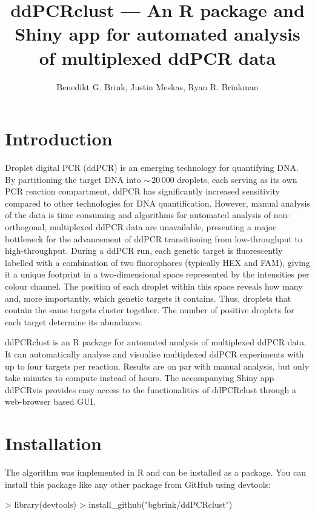 \documentclass{article}
\title{ddPCRclust --- An R package and Shiny app for automated analysis of multiplexed ddPCR data}
\author{Benedikt G. Brink, Justin Meskas, Ryan R. Brinkman}
\begin{document}


\maketitle

\tableofcontents

\section{Introduction}

Droplet digital PCR (ddPCR) is an emerging technology for quantifying DNA. By partitioning the target DNA into $\sim\,$20$\,$000 droplets, each serving as its own PCR reaction compartment, ddPCR has significantly increased sensitivity compared to other technologies for DNA quantification. However, manual analysis of the data is time consuming and algorithms for automated analysis of non-orthogonal, multiplexed ddPCR data are unavailable, presenting a major bottleneck for the advancement of ddPCR transitioning from low-throughput to high-throughput. During a ddPCR run, each genetic target is fluorescently labelled with a combination of two fluorophores (typically HEX and FAM), giving it a unique footprint in a two-dimensional space represented by the intensities per colour channel. The position of each droplet within this space reveals how many and, more importantly, which genetic targets it contains. Thus, droplets that contain the same targets cluster together. The number of positive droplets for each target determine its abundance.

ddPCRclust is an R package for automated analysis of multiplexed ddPCR data. It can automatically analyse and visualise multiplexed ddPCR experiments with up to four targets per reaction. Results are on par with manual analysis, but only take minutes to compute instead of hours. The accompanying Shiny app ddPCRvis provides easy access to the functionalities of ddPCRclust through a web-browser based GUI.

\section{Installation}
The algorithm was implemented in R and can be installed as a package. You can install this package like any other package from GitHub using devtools:

\begin{Schunk}
\begin{Sinput}
> library(devtools)
> install_github("bgbrink/ddPCRclust")
\end{Sinput}
\end{Schunk}
\end{document}
